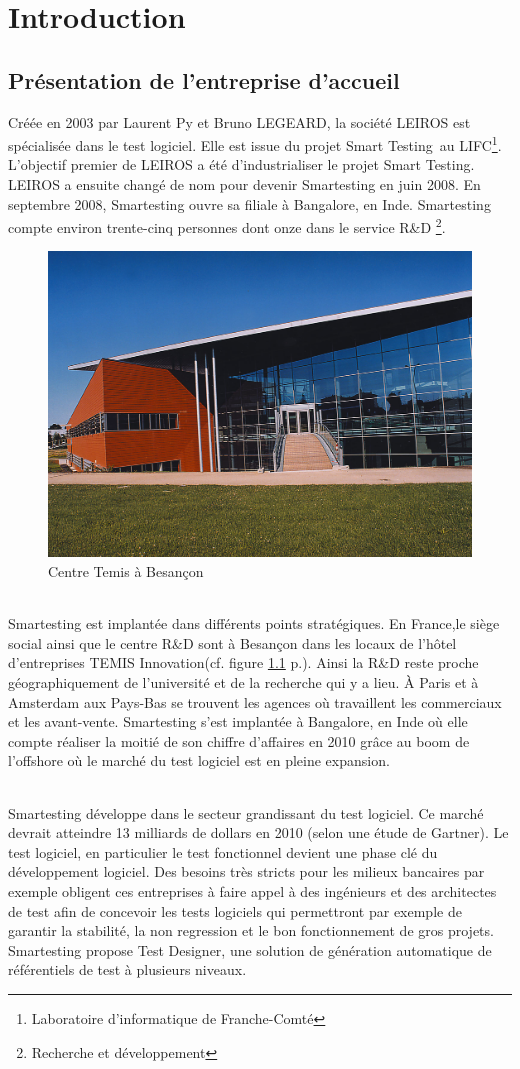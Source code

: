 \chapter{Introduction}

\section{Présentation de l'entreprise d'accueil}
Créée en 2003 par Laurent Py et Bruno LEGEARD, la société LEIROS est spécialisée dans le test logiciel. Elle est issue du projet Smart Testing\texttrademark ~au LIFC\footnote{Laboratoire d'informatique de Franche-Comté}. L'objectif premier de LEIROS a été d'industrialiser le projet Smart Testing\texttrademark.  LEIROS a ensuite changé de nom pour devenir Smartesting en juin 2008. En septembre 2008, Smartesting ouvre sa filiale à Bangalore, en Inde. Smartesting compte environ trente-cinq personnes dont onze dans le service R\&D \footnote{Recherche et développement}.

\begin{figure}[!ht]
\centering
\includegraphics[width=.55\textwidth]{Illustrations/temis.jpg}
\caption{Centre Temis à Besançon}
\label{figure:temis}
\end{figure}

\subparagraph*{}
Smartesting est implantée dans différents points stratégiques. En France,le siège social ainsi que le centre R\&D sont à Besançon dans les locaux de l'hôtel d'entreprises TEMIS Innovation(cf. figure \ref{figure:temis} p.\pageref{figure:temis}). Ainsi la R\&D reste proche géographiquement de l'université et de la recherche qui y a lieu. À Paris et à Amsterdam aux Pays-Bas se trouvent les agences où travaillent les commerciaux et les avant-vente. Smartesting s'est implantée à Bangalore, en Inde où elle compte réaliser la moitié de son chiffre d'affaires en 2010 grâce au boom de l'offshore où le marché du test logiciel est en pleine expansion.

\subparagraph*{}
Smartesting développe dans le secteur grandissant du test logiciel. Ce marché devrait atteindre 13 milliards de dollars en 2010 (selon une étude de Gartner). Le test logiciel, en particulier le test fonctionnel devient une phase clé du développement logiciel. Des besoins très stricts pour les milieux bancaires par exemple obligent ces entreprises à faire appel à des ingénieurs et des architectes de test afin de concevoir les tests logiciels qui permettront par exemple de garantir la stabilité, la non regression et le bon fonctionnement de gros projets. Smartesting propose Test Designer, une solution de génération automatique de référentiels de test à plusieurs niveaux.


